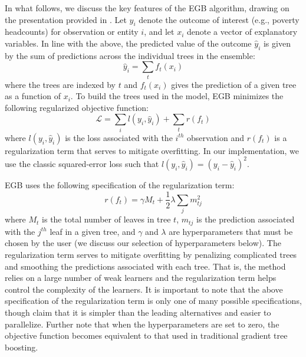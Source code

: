\documentclass[english]{article}
\begin{document}
In what follows, we discuss the key features of the EGB algorithm, drawing on the presentation provided 
in \citet{chen2016xgboost}.
Let $y_i$ denote the outcome of interest (e.g., poverty headcounts) for observation or entity $i$, and let 
$x_i$ denote a vector of explanatory variables.
In line with the above, the predicted value of the outcome $\hat{y}_i$ is given by the sum of predictions
across the individual trees in the ensemble:
\begin{equation}
\hat{y}_i = \sum_t f_t(x_i)
\end{equation}
where the trees are indexed by $t$ and $f_t(x_i)$ gives the prediction of a given tree as a function of 
$x_i$.
To build the trees used in the model, EGB minimizes the following regularized objective function:
\begin{equation}
\mathcal{L} = \sum_i l(y_i, \hat{y}_i) + \sum_t r(f_t)
\end{equation}
where $l(y_i, \hat{y}_i)$ is the loss associated with the $i^{th}$ observation and $r(f_t)$ is a 
regularization term that serves to mitigate overfitting.
In our implementation, we use the classic squared-error loss such that $l(y_i, \hat{y}_i) = 
(y_i - \hat{y}_i)^2$.

EGB uses the following specification of the regularization term:
\begin{equation}
r(f_t) = \gamma M_t +  \frac{1}{2}\lambda \sum_j m_{tj}^2
\end{equation}
where $M_t$ is the total number of leaves in tree $t$, $m_{tj}$ is the prediction
associated with the $j^{th}$ leaf in a given tree, and $\gamma$ and $\lambda$ are 
hyperparameters that must be chosen by the user (we discuss our selection of
hyperparameters below).
The regularization term serves to mitigate overfitting by penalizing complicated trees 
and smoothing the predictions associated with each tree.
That is, the method relies on a large number of weak learners and the regularization 
term helps control the complexity of the learners.
It is important to note that the above specification of the regularization term is only one of many 
possible specifications, though \citet{chen2016xgboost} claim that it is simpler than the
leading alternatives and easier to parallelize.
Further note that when the hyperparameters are set to zero, the objective function becomes
equivalent to that used in traditional gradient tree boosting.
\end{document}
